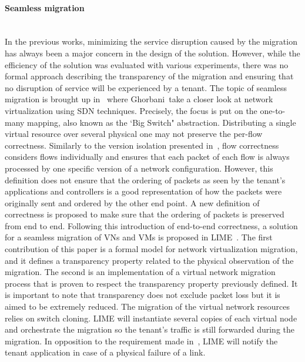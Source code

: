 \paragraph{Seamless migration}\textbf{\\}
In the previous works, minimizing the service disruption caused by the migration has always been a major concern in the design of the solution. However, while the efficiency of the solution was evaluated with various experiments, there was no formal approach describing the transparency of the migration and ensuring that no disruption of service will be experienced by a tenant.
The topic of seamless migration is brought up in~\cite{toward-Ghorbani2014} where Ghorbani~\etal take a closer look at network virtualization using SDN techniques.
Precisely, the focus is put on the one-to-many mapping, also known as the `Big Switch" abstraction.
Distributing a single virtual resource over several physical one may not preserve the per-flow correctness.
Similarly to the version isolation presented in~\cite{Liu2015a}, flow correctness considers flows individually and ensures that each packet of each flow  is always processed by one specific version of a network configuration. 
However, this definition does not ensure that the ordering of packets as seen by the tenant's applications and controllers is a good representation of how the packets were originally sent and ordered by the other end point.
A new definition of correctness is proposed to make sure that the ordering of packets is preserved from end to end.
Following this introduction of end-to-end correctness, a solution for a seamless migration of VNs and VMs is proposed in LIME~\cite{Lime-Ghorbani2014}.
The first contribution of this paper is a formal model for network virtualization migration, and it defines a transparency property related to the physical observation of the migration.
The second is an implementation of a virtual network migration process that is proven to respect the transparency property previously defined.
It is important to note that transparency does not exclude packet loss but it is aimed to be extremely reduced.
The migration of the virtual network resources relies on switch cloning.
LIME will instantiate several copies of each virtual node and orchestrate the migration so the tenant's traffic is still forwarded during the migration.
In opposition to the requirement made in~\cite{Ko2017c}, LIME will notify the tenant application in case of a physical failure of a link.
